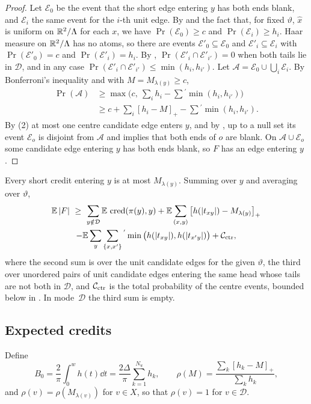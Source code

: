 \documentclass[11pt,colorlinks]{charlie}
\newcommand{\cD}{\mathcal{D}}
\newcommand{\pos}[1]{\left[#1\right]_+}
\newcommand{\cred}{\operatorname{cred}}
\begin{document}
\begin{proof}
Let $\mathcal E_0$ be the event that the short edge entering $y$ has both ends blank, and $\mathcal E_i$ the same event for the $i$-th unit edge. By  and the fact that, for fixed $\vartheta$, $\hat x$ is uniform on $\mathbb{R}^2/\Lambda$ for each $x$, we have $\Pr(\mathcal E_0)\ge c$ and $\Pr(\mathcal E_i)\ge h_i$. Haar measure on $\mathbb{R}^2/\Lambda$ has no atoms, so there are events $\mathcal E'_0\subseteq\mathcal E_0$ and $\mathcal E'_i\subseteq\mathcal E_i$ with $\Pr(\mathcal E'_0)=c$ and $\Pr(\mathcal E'_i)=h_i$. By , $\Pr(\mathcal E'_i\cap\mathcal E'_{i'})=0$ when both tails lie in $\cD$, and in any case $\Pr(\mathcal E'_i\cap\mathcal E'_{i'})\le\min(h_i,h_{i'})$. Let $\mathcal A=\mathcal E_0\cup\bigcup_i\mathcal E_i$. By Bonferroni's inequality and  with $M=M_{\lambda(y)}\ge c$,
\begin{align*}
 \Pr(\mathcal A)&\ge\max\Big(c,\ \sum_ih_i-\sum{}^{'}\min(h_i,h_{i'})\Big)\\
 &\ge c+\sum_i\pos{h_i-M}-\sum{}^{'}\min(h_i,h_{i'}).
\end{align*}
By (2) at most one centre candidate edge enters $y$, and by , up to a null set its event $\mathcal E_o$ is disjoint from $\mathcal A$ and implies that both ends of $o$ are blank. On $\mathcal A\cup\mathcal E_o$ some candidate edge entering $y$ has both ends blank, so $F$ has an edge entering $y$.
\end{proof}

Every short credit entering $y$ is at most $M_{\lambda(y)}$. Summing  over $y$ and averaging over $\vartheta$,
\begin{multline}\label{eq:credit-split}
 \E\,|F|\ \ge\ \sum_{y\notin\cD}\E\,\cred(\pi(y),y)+\E\sum_{(x,y)}\pos{h(|t_{xy}|)-M_{\lambda(y)}}\\
 -\E\sum_y\sum_{\{x,x'\}}{}^{'}\min\big(h(|t_{xy}|),h(|t_{x'y}|)\big)+\mathcal C_{\rm ctr},
\end{multline}
where the second sum is over the unit candidate edges for the given $\vartheta$, the third over unordered pairs of unit candidate edges entering the same head whose tails are not both in $\cD$, and $\mathcal C_{\rm ctr}$ is the total probability of the centre events, bounded below in . In mode~$\cD$ the third sum is empty.

\subsection{Expected credits}
Define
\[
 B_0=\frac2\pi\int_0^wh(t)\dd t=\frac{2\Delta}{\pi}\sum_{k=1}^{N_u}h_k,\qquad \rho(M)=\frac{\sum_k\pos{h_k-M}}{\sum_kh_k},
\]
and $\rho(v)=\rho(M_{\lambda(v)})$ for $v\in X$, so that $\rho(v)=1$ for $v\in\cD$.
\end{document}
